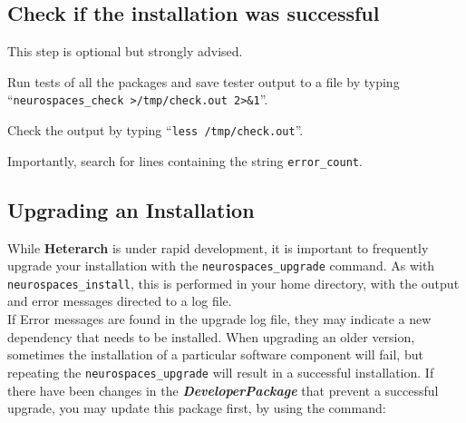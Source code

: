 \documentclass[12pt]{article}
\begin{document}
\subsection*{Check if the installation was successful}

This step is optional but strongly advised.

\begin{description}      
   \item Run tests of all the packages and save tester output to a file  by typing ``{\tt neurospaces\_check >/tmp/check.out 2>\&1}''.
   \item Check the output by typing ``{\tt less /tmp/check.out}''.
\end{description}
Importantly, search for lines containing the string {\tt error\_count}.    


%
%
%
%

\subsection*{Upgrading an Installation}

While {\bf\small{Heterarch}} is under rapid development, it is important to frequently
upgrade your installation with the {\tt neurospaces\_upgrade} command.
As with {\tt neurospaces\_install}, this is performed in your home
directory, with the output and error messages directed to a log file.\\
If Error messages are found in the upgrade log file, they may indicate
a new dependency that needs to be installed.  When upgrading an older
version, sometimes the installation of a particular software component
will fail, but repeating the {\tt neurospaces\_upgrade} will result in a
successful installation.  If there have been changes in the {\bf{\emph{DeveloperPackage}}} that prevent a successful upgrade, you may update
this package first, by using the command:
\end{document}
